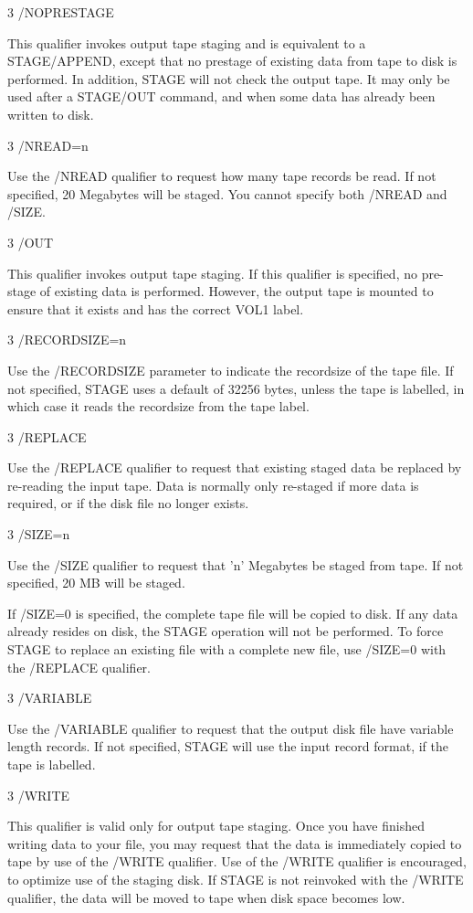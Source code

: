 \begin{XMP}
3 /NOPRESTAGE

This qualifier invokes output tape staging and is equivalent to a STAGE/APPEND,
except that no prestage of existing data from tape to disk is performed.
In  addition, STAGE will not check the output tape. It may only be
used after a STAGE/OUT command, and when some data has already
been written to disk.

3 /NREAD=n

Use the /NREAD qualifier to request how many tape records be read.
If not specified, 20 Megabytes will be staged. You cannot specify
both /NREAD and /SIZE.

3 /OUT

This qualifier invokes output tape staging.
If this qualifier is specified, no pre-stage of existing data
is performed. However, the output tape is mounted to ensure that
it exists and has the correct VOL1 label.


3 /RECORDSIZE=n

Use the /RECORDSIZE parameter to indicate the recordsize of the tape file.
If not specified, STAGE uses a default of 32256 bytes, unless the tape is
labelled, in which case it reads the recordsize from the tape label.

3 /REPLACE

Use the /REPLACE qualifier to request that existing staged data be replaced
by re-reading the input tape. Data is normally only re-staged if more data
is required, or if the disk file no longer exists.

3 /SIZE=n

Use the /SIZE qualifier to request that 'n' Megabytes be staged from tape.
If not specified, 20 MB will be staged.

If /SIZE=0 is specified, the complete tape file will be copied to disk.
If any data already resides on disk, the STAGE operation will not be
performed. To force STAGE to replace an existing file with a complete
new file, use /SIZE=0 with the /REPLACE qualifier.

3 /VARIABLE

Use the /VARIABLE qualifier to request that the output disk file have
variable length records. If not specified, STAGE will use the input record
format, if the tape is labelled.

3 /WRITE

This qualifier is valid only for output tape staging.
Once you have finished writing data to your file, you may request that
the data is immediately copied to tape by use of the /WRITE qualifier.
Use of the /WRITE qualifier is encouraged, to optimize use of the
staging disk. If STAGE is not reinvoked with the /WRITE qualifier,
the data will be moved to tape when disk space becomes low.


\end{XMP}
